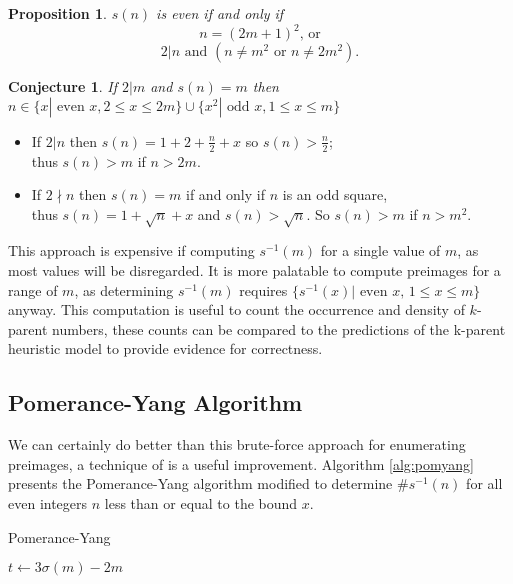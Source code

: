 \documentclass{article}
\theoremstyle{definition}
\newtheorem{conjecture}{Conjecture}[section]
\newtheorem{proposition}{Proposition}[section]
\begin{document}
\begin{proposition} \textit{$s(n)$ is even if and only if}
    $$n = (2m+1)^2 \text{, or}$$
    $$2 | n \text{ and } (n \neq m^2 \text{ or } n \neq 2m^2).$$
\end{proposition}

\begin{conjecture} \textit{If $2 | m$ and $s(n) = m$ then $n \in \{x| \text{ even } x, 2 \leq x \leq 2m \} \cup \{x^2| \text{ odd } x, 1 \leq x \leq m\}$}
    \begin{itemize}
        \item If $2 | n$ then $s(n) = 1+ 2 + \frac{n}{2} + x $ so $s(n) > \frac{n}{2}$;\\
              thus $s(n) > m$ if $n > 2m$.

        \item If $2 \nmid n$ then $s(n) = m$ if and only if $n$ is an odd square,\\
              thus $s(n) = 1 + \sqrt{n} + x$ and $s(n) > \sqrt{n}$. So $s(n) > m$ if $n > m^2$.

    \end{itemize}
\end{conjecture}

This approach is expensive if computing $s^{-1}(m)$ for a single value of $m$, as most values will be disregarded. It is more palatable to compute preimages for a range of $m$, as determining $s^{-1}(m)$ requires $\{s^{-1}(x)|\text{ even } x,\, 1 \leq x \leq m\}$ anyway. This computation is useful to count the occurrence and density of $k$-parent numbers, these counts can be compared to the predictions of the k-parent heuristic model to provide evidence for correctness.

\subsection{Pomerance-Yang Algorithm}
We can certainly do better than this brute-force approach for enumerating preimages, a technique of \cite{pomYang} is a useful improvement. Algorithm \ref{alg:pomyang} presents the Pomerance-Yang algorithm modified to determine $\#s^{-1}(n)$ for all even integers $n$ less than or equal to the bound $x$.

\begin{algorithm}[]
    \caption{Pomerance-Yang}
    \label{alg:pomyang}
    \begin{algorithmic}[1]
        \State $t \gets 3\sigma(m) - 2m$
        \EndWhile
        \EndIf
         
        \EndIf
        \EndFor
        \ForAll{odd composite $m \in [1, x^{2/3})$}
        \EndIf
        \EndFor
        \EndProcedure
    \end{algorithmic}
\end{algorithm}
\end{document}
